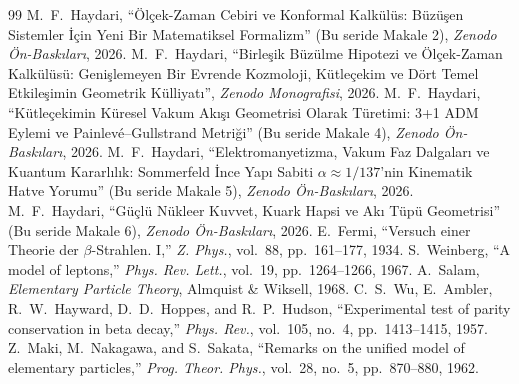 \documentclass[11pt,a4paper]{article}
\begin{document}
\begin{thebibliography}{99}
     M.~F.~Haydari, ``Ölçek-Zaman Cebiri ve Konformal Kalkülüs: Büzüşen Sistemler İçin Yeni Bir Matematiksel Formalizm'' (Bu seride Makale 2), \textit{Zenodo Ön-Baskıları}, 2026.
     M.~F.~Haydari, ``Birleşik Büzülme Hipotezi ve Ölçek-Zaman Kalkülüsü: Genişlemeyen Bir Evrende Kozmoloji, Kütleçekim ve Dört Temel Etkileşimin Geometrik Külliyatı'', \textit{Zenodo Monografisi}, 2026.
     M.~F.~Haydari, ``Kütleçekimin Küresel Vakum Akışı Geometrisi Olarak Türetimi: 3+1 ADM Eylemi ve Painlevé--Gullstrand Metriği'' (Bu seride Makale 4), \textit{Zenodo Ön-Baskıları}, 2026.
     M.~F.~Haydari, ``Elektromanyetizma, Vakum Faz Dalgaları ve Kuantum Kararlılık: Sommerfeld İnce Yapı Sabiti $\alpha \approx 1/137$'nin Kinematik Hatve Yorumu'' (Bu seride Makale 5), \textit{Zenodo Ön-Baskıları}, 2026.
     M.~F.~Haydari, ``Güçlü Nükleer Kuvvet, Kuark Hapsi ve Akı Tüpü Geometrisi'' (Bu seride Makale 6), \textit{Zenodo Ön-Baskıları}, 2026.
     E.~Fermi, ``Versuch einer Theorie der $\beta$-Strahlen. I,'' \textit{Z. Phys.}, vol.~88, pp.~161--177, 1934.
     S.~Weinberg, ``A model of leptons,'' \textit{Phys. Rev. Lett.}, vol.~19, pp.~1264--1266, 1967.
     A.~Salam, \textit{Elementary Particle Theory}, Almquist \& Wiksell, 1968.
     C.~S.~Wu, E.~Ambler, R.~W.~Hayward, D.~D.~Hoppes, and R.~P.~Hudson, ``Experimental test of parity conservation in beta decay,'' \textit{Phys. Rev.}, vol.~105, no.~4, pp.~1413--1415, 1957.
     Z.~Maki, M.~Nakagawa, and S.~Sakata, ``Remarks on the unified model of elementary particles,'' \textit{Prog. Theor. Phys.}, vol.~28, no.~5, pp.~870--880, 1962.
\end{thebibliography}
\end{document}
